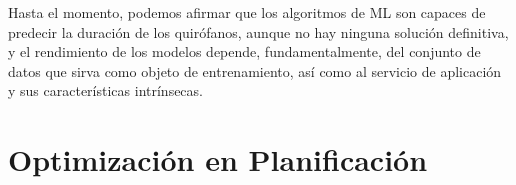 Hasta el momento, podemos afirmar que los algoritmos de ML son capaces de predecir la duración de los quirófanos, aunque no hay ninguna solución definitiva, y el rendimiento de los modelos depende, fundamentalmente, del conjunto de datos que sirva como objeto de entrenamiento, así como al servicio de aplicación y sus características intrínsecas.

\newpage
\section{Optimización en Planificación}

